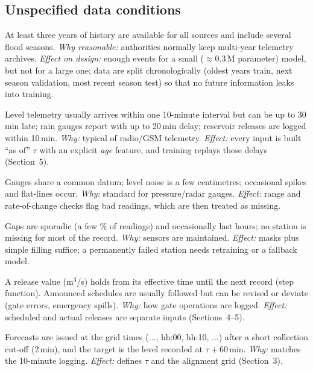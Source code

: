 \subsection*{Unspecified data conditions}
\begin{description}[leftmargin=0.9cm, style=nextline]
\item[A1 Record length.] At least three years of history are available for all sources and include
several flood seasons. \emph{Why reasonable:} authorities normally keep multi-year telemetry archives.
\emph{Effect on design:} enough events for a small ($\approx$0.3\,M parameter) model, but not for a large
one; data are split chronologically (oldest years train, next season validation, most recent season
test) so that no future information leaks into training.
\item[A2 Reporting delays.] Level telemetry usually arrives within one 10-minute interval but can be up
to 30\,min late; rain gauges report with up to 20\,min delay; reservoir releases are logged within
10\,min. \emph{Why:} typical of radio/GSM telemetry. \emph{Effect:} every input is built ``as of''
$\tau$ with an explicit \emph{age} feature, and training replays these delays (Section~5).
\item[A3 Measurement quality.] Gauges share a common datum; level noise is a few centimetres;
occasional spikes and flat-lines occur. \emph{Why:} standard for pressure/radar gauges.
\emph{Effect:} range and rate-of-change checks flag bad readings, which are then treated as missing.
\item[A4 Missingness.] Gaps are sporadic (a few \% of readings) and occasionally last hours; no
station is missing for most of the record. \emph{Why:} sensors are maintained. \emph{Effect:} masks
plus simple filling suffice; a permanently failed station needs retraining or a fallback model.
\item[A5 Release semantics.] A release value (m$^3$/s) holds from its effective time until the next
record (step function). Announced schedules are usually followed but can be revised or deviate
(gate errors, emergency spills). \emph{Why:} how gate operations are logged. \emph{Effect:} scheduled
and actual releases are separate inputs (Sections~4--5).
\item[A6 Issuance timing.] Forecasts are issued at the grid times
($\ldots$, hh:00, hh:10, $\ldots$) after a short collection cut-off (2\,min), and the target is the
level recorded at $\tau+60$\,min. \emph{Why:} matches the 10-minute logging. \emph{Effect:} defines
$\tau$ and the alignment grid (Section~3).
\end{description}

